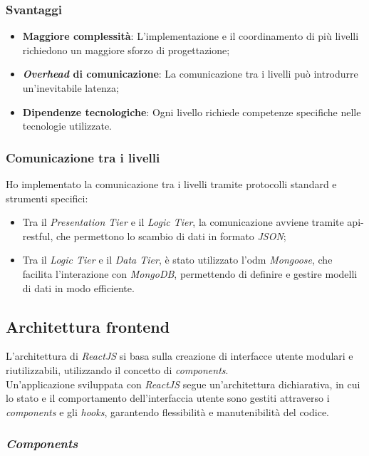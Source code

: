 \subsubsection{Svantaggi}
\begin{itemize}
    \item \textbf{Maggiore complessità}: L'implementazione e il coordinamento di più livelli richiedono un maggiore sforzo di progettazione;
    \item \textbf{\textit{Overhead} di comunicazione}: La comunicazione tra i livelli può introdurre un'inevitabile latenza;
    \item \textbf{Dipendenze tecnologiche}: Ogni livello richiede competenze specifiche nelle tecnologie utilizzate.
\end{itemize}

\subsubsection{Comunicazione tra i livelli}

\noindent Ho implementato la comunicazione tra i livelli tramite protocolli standard e strumenti specifici:
\begin{itemize}
    \item Tra il \textit{Presentation Tier} e il \textit{Logic Tier}, la comunicazione avviene tramite \gls{api-restful}, che permettono lo scambio di dati in formato \textit{JSON};
    \item Tra il \textit{Logic Tier} e il \textit{Data Tier}, è stato utilizzato l'\gls{odm} \textit{Mongoose}, che facilita l'interazione con \textit{MongoDB}, permettendo di definire e gestire modelli di dati in modo efficiente.
\end{itemize}

\subsection*{Architettura \gls{frontend}}

L'architettura di \textit{ReactJS} si basa sulla creazione di interfacce utente modulari e riutilizzabili, utilizzando il concetto di \textit{components}. \\
Un'applicazione sviluppata con \textit{ReactJS} segue un'architettura dichiarativa, in cui lo stato e il comportamento dell'interfaccia utente sono gestiti attraverso i \textit{components} e gli \textit{hooks}, garantendo flessibilità e manutenibilità del codice.

\subsubsection{\textit{Components}}

